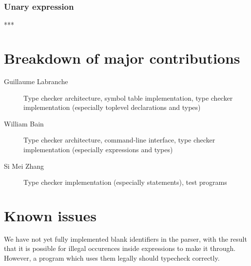 \documentclass[oneside]{article}
\begin{document}
\subsubsection{Unary expression}
***

\section{Breakdown of major contributions}

\begin{description}
    \item[Guillaume Labranche] Type checker architecture, symbol table implementation, type checker implementation (especially toplevel declarations and types)
    \item[William Bain] Type checker architecture, command-line interface, type checker implementation (especially expressions and types)
    \item[Si Mei Zhang] Type checker implementation (especially statements), test programs
\end{description}

\section{Known issues}

We have not yet fully implemented blank identifiers in the parser, with the result that it is possible for illegal occurences inside expressions to make it through. However, a program which uses them legally should typecheck correctly.
\end{document}
